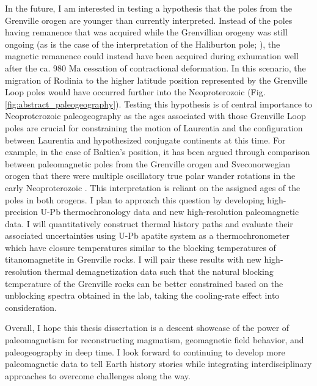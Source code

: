 In the future, I am interested in testing a hypothesis that the poles from the Grenville orogen are younger than currently interpreted. Instead of the poles having remanence that was acquired while the Grenvillian orogeny was still ongoing (as is the case of the interpretation of the Haliburton pole; \citealp{Warnock2000a}), the magnetic remanence could instead have been acquired during exhumation well after the ca. 980 Ma cessation of contractional deformation. In this scenario, the migration of Rodinia to the higher latitude position represented by the Grenville Loop poles would have occurred further into the Neoproterozoic (Fig. \ref{fig:abstract_paleogeography}). Testing this hypothesis is of central importance to Neoproterozoic paleogeography as the ages associated with those Grenville Loop poles are crucial for constraining the motion of Laurentia and the configuration between Laurentia and hypothesized conjugate continents at this time. For example, in the case of Baltica's position, it has been argued through comparison between paleomagnetic poles from the Grenville orogen and Sveconorwegian orogen that there were multiple oscillatory true polar wander rotations in the early Neoproterozoic \citep{Evans2015a, Gong2018a}. This interpretation is reliant on the assigned ages of the poles in both orogens. I plan to approach this question by developing high-precision U-Pb thermochronology data and new high-resolution paleomagnetic data. I will quantitatively construct thermal history paths and evaluate their associated uncertainties using U-Pb apatite system as a thermochronometer which have closure temperatures similar to the blocking temperatures of titanomagnetite in Grenville rocks. I will pair these results with new high-resolution thermal demagnetization data such that the natural blocking temperature of the Grenville rocks can be better constrained based on the unblocking spectra obtained in the lab, taking the cooling-rate effect into consideration. 

Overall, I hope this thesis dissertation is a descent showcase of the power of paleomagnetism for reconstructing magmatism, geomagnetic field behavior, and paleogeography in deep time. I look forward to continuing to develop more paleomagnetic data to tell Earth history stories while integrating interdisciplinary approaches to overcome challenges along the way.